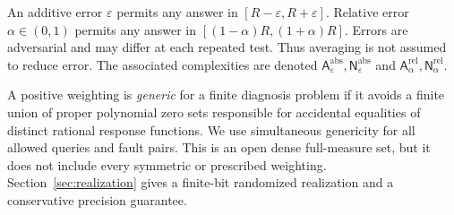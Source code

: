 \documentclass[11pt,letterpaper]{article}
\newcommand{\A}{\mathsf A}
\newcommand{\N}{\mathsf N}
\begin{document}
An additive error $\varepsilon$ permits any answer in $[R-\varepsilon,R+\varepsilon]$. Relative error $\alpha\in(0,1)$ permits any answer in $[(1-\alpha)R,(1+\alpha)R]$. Errors are adversarial and may differ at each repeated test. Thus averaging is not assumed to reduce error. The associated complexities are denoted $\A^{\mathrm{abs}}_\varepsilon,\N^{\mathrm{abs}}_\varepsilon$ and $\A^{\mathrm{rel}}_\alpha,\N^{\mathrm{rel}}_\alpha$.

A positive weighting is \emph{generic} for a finite diagnosis problem if it avoids a finite union of proper polynomial zero sets responsible for accidental equalities of distinct rational response functions. We use simultaneous genericity for all allowed queries and fault pairs. This is an open dense full-measure set, but it does not include every symmetric or prescribed weighting. Section~\ref{sec:realization} gives a finite-bit randomized realization and a conservative precision guarantee.
\end{document}
